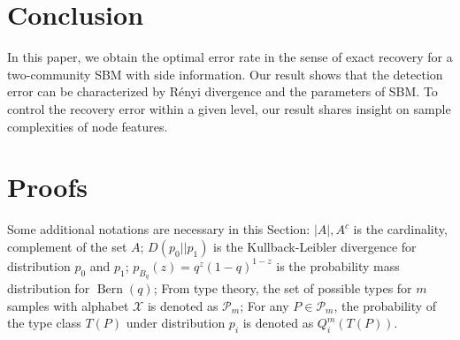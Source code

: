 \documentclass[conference]{IEEEtran}
\DeclareMathOperator{\Bern}{Bern}
\begin{document}
\section{Conclusion}\label{s:conclusion}
In this paper, we obtain the optimal error rate in the sense of exact recovery for a two-community SBM with side information. Our result
shows that the detection error can be characterized by Rényi divergence and the parameters of SBM. To control the recovery error within a given level,
our result shares insight on sample complexities of node features.
\section{Proofs}\label{s:proof}
Some additional notations are necessary in this Section: $|A|, A^c$ is the cardinality, complement of the set $A$;
$D(p_0 || p_1)$ is the Kullback-Leibler divergence for distribution $p_0$ and $p_1$;
$p_{B_q}(z) = q^z(1-q)^{1-z}$ is the probability mass distribution for $\Bern(q)$;
From type theory, the set of possible types
for $m$ samples with alphabet $\mathcal{X}$ is denoted as $\mathcal{P}_m$; For any $P\in \mathcal{P}_m$, the probability of the type
class $T(P)$ under distribution $p_i$ is denoted as $Q_i^{m}(T(P))$.
\end{document}

